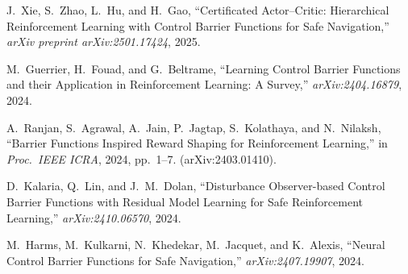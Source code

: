 \documentclass[10pt,conference]{IEEEtran}
\begin{document}

\begin{thebibliography}{99}

J.~Xie, S.~Zhao, L.~Hu, and H.~Gao, ``Certificated Actor--Critic: Hierarchical Reinforcement Learning with Control Barrier Functions for Safe Navigation,'' \emph{arXiv preprint arXiv:2501.17424}, 2025.

M.~Guerrier, H.~Fouad, and G.~Beltrame, ``Learning Control Barrier Functions and their Application in Reinforcement Learning: A Survey,'' \emph{arXiv:2404.16879}, 2024.

A.~Ranjan, S.~Agrawal, A.~Jain, P.~Jagtap, S.~Kolathaya, and N.~Nilaksh, ``Barrier Functions Inspired Reward Shaping for Reinforcement Learning,'' in \emph{Proc.\ IEEE ICRA}, 2024, pp.~1--7. (arXiv:2403.01410).

D.~Kalaria, Q.~Lin, and J.~M.~Dolan, ``Disturbance Observer-based Control Barrier Functions with Residual Model Learning for Safe Reinforcement Learning,'' \emph{arXiv:2410.06570}, 2024.

M.~Harms, M.~Kulkarni, N.~Khedekar, M.~Jacquet, and K.~Alexis, ``Neural Control Barrier Functions for Safe Navigation,'' \emph{arXiv:2407.19907}, 2024.

\end{thebibliography}
\end{document}
